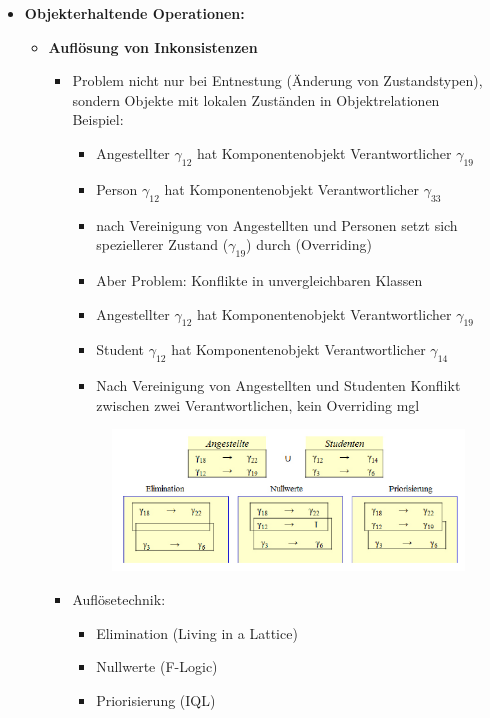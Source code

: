 \begin{itemize}
	\item \textbf{Objekterhaltende Operationen:}
	\begin{itemize}
		\item \textbf{Auflösung von Inkonsistenzen}		\begin{itemize}
			\item Problem nicht nur bei Entnestung (Änderung von Zustandstypen), sondern Objekte mit lokalen Zuständen in Objektrelationen\\
			Beispiel:
			\begin{itemize}
				\item Angestellter $\gamma_{12}$ hat Komponentenobjekt Verantwortlicher $\gamma_{19}$
				\item Person $\gamma_{12}$ hat Komponentenobjekt Verantwortlicher $\gamma_{33}$
				\item nach Vereinigung von Angestellten und Personen setzt sich speziellerer Zustand ($\gamma_{19}$) durch (Overriding)
				\item Aber Problem: Konflikte in unvergleichbaren Klassen
				\item Angestellter $\gamma_{12}$ hat Komponentenobjekt Verantwortlicher $\gamma_{19}$
				\item Student $\gamma_{12}$ hat Komponentenobjekt Verantwortlicher $\gamma_{14}$
				\item Nach Vereinigung von Angestellten und Studenten Konflikt zwischen zwei Verantwortlichen, kein Overriding mgl
			\end{itemize}
			\begin{figure}[!h]
				\centering
				\includegraphics[scale=0.70]{img/resolve_inconsistency.png}
			\end{figure}
			\item Auflösetechnik:
			\begin{itemize}
				\item Elimination (Living in a Lattice)
				\item Nullwerte (F-Logic)
				\item Priorisierung (IQL)

\end{itemize}
\end{itemize}
\end{itemize}
\end{itemize}
